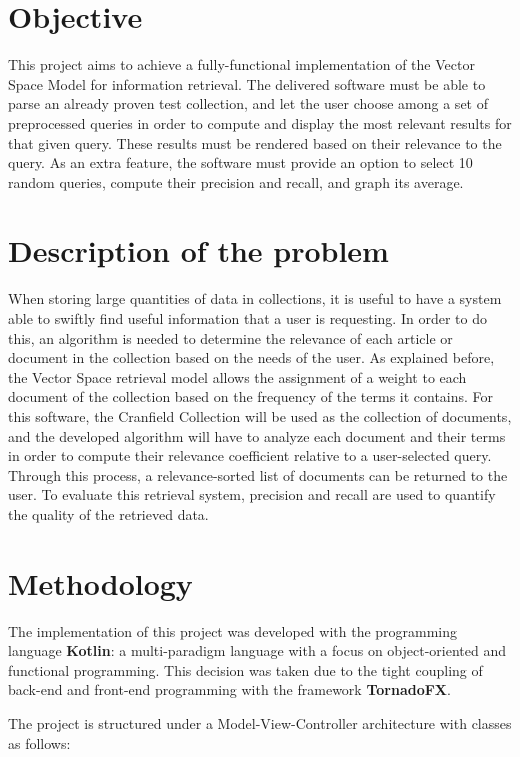 \documentclass{article}
\begin{document}
\section{Objective}
This project aims to achieve a fully-functional implementation of the Vector Space Model for information retrieval. The delivered software must be able to parse an already proven test collection, and let the user choose among a set of preprocessed queries in order to compute and display the most relevant results for that given query. These results must be rendered based on their relevance to the query. As an extra feature, the software must provide an option to select 10 random queries, compute their precision and recall, and graph its average.

\section{Description of the problem}
When storing large quantities of data in collections, it is useful to have a system able to swiftly find useful information that a user is requesting. In order to do this, an algorithm is needed to determine the relevance of each article or document in the collection based on the needs of the user. As explained before, the Vector Space retrieval model allows the assignment of a weight to each document of the collection based on the frequency of the terms it contains. For this software, the Cranfield Collection will be used as the collection of documents, and the developed algorithm will have to analyze each document and their terms in order to compute their relevance coefficient relative to a user-selected query. Through this process, a relevance-sorted list of documents can be returned to the user.
To evaluate this retrieval system, precision and recall are used to quantify the quality of the retrieved data.


\section{Methodology}
The implementation of this project was developed with the programming language \textbf{Kotlin}: a multi-paradigm language with a focus on object-oriented and functional programming. This decision was taken due to the tight coupling of back-end and front-end programming with the framework \textbf{TornadoFX}.

The project is structured under a Model-View-Controller architecture with classes as follows:
\end{document}
